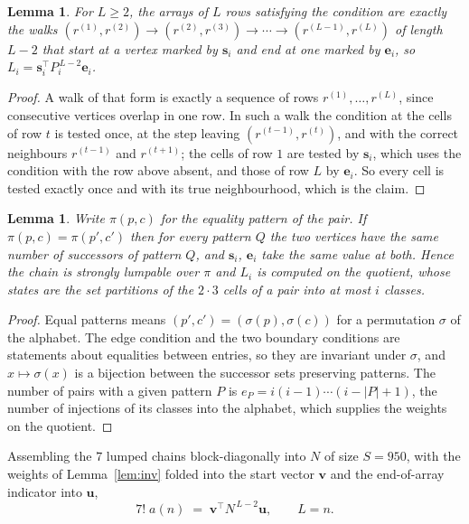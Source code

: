 \documentclass[11pt,a4paper]{article}
\theoremstyle{plain}
\newtheorem{lemma}[theorem]{Lemma}
\theoremstyle{definition}
\begin{document}
\begin{lemma}\label{lem:walk}
For $L\ge2$, the arrays of $L$ rows satisfying the condition are exactly the walks
$(r^{(1)},r^{(2)})\to(r^{(2)},r^{(3)})\to\cdots\to(r^{(L-1)},r^{(L)})$ of length
$L-2$ that start at a vertex marked by $\mathbf{s}_i$ and end at one marked by
$\mathbf{e}_i$, so
$L_i=\mathbf{s}_i^{\!\top}P_i^{\,L-2}\mathbf{e}_i$.
\end{lemma}

\begin{proof}
A walk of that form is exactly a sequence of rows $r^{(1)},\dots,r^{(L)}$, since
consecutive vertices overlap in one row. In such a walk the condition at the cells of
row $t$ is tested once, at the step leaving $(r^{(t-1)},r^{(t)})$, and with the
correct neighbours $r^{(t-1)}$ and $r^{(t+1)}$; the cells of row $1$ are tested by
$\mathbf{s}_i$, which uses the condition with the row above absent, and those of row
$L$ by $\mathbf{e}_i$. So every cell is tested exactly once and with its true
neighbourhood, which is the claim.
\end{proof}

\begin{lemma}\label{lem:lump}
Write $\pi(p,c)$ for the equality pattern of the pair. If $\pi(p,c)=\pi(p',c')$ then for
every pattern $Q$ the two vertices have the same number of successors of pattern $Q$, and
$\mathbf{s}_i$, $\mathbf{e}_i$ take the same value at both. Hence the chain is strongly
lumpable over $\pi$ and $L_i$ is computed on the quotient, whose states are the set
partitions of the $2\cdot3$ cells of a pair into at most $i$ classes.
\end{lemma}

\begin{proof}
Equal patterns means $(p',c')=(\sigma(p),\sigma(c))$ for a permutation $\sigma$ of the
alphabet. The edge condition and the two boundary conditions are statements about equalities
between entries, so they are invariant under $\sigma$, and $x\mapsto\sigma(x)$ is a bijection
between the successor sets preserving patterns. The number of pairs with a given pattern $P$
is $e_P=i(i-1)\cdots(i-|P|+1)$, the number of injections of its classes into the alphabet,
which supplies the weights on the quotient.
\end{proof}

Assembling the $7$ lumped chains block-diagonally into $N$ of size $S=950$, with the
weights of Lemma~\ref{lem:inv} folded into the start vector $\mathbf{v}$ and the
end-of-array indicator into $\mathbf{u}$,
\begin{equation}\label{eq:walk2}
7!\;a(n)\;=\;\mathbf{v}^{\!\top}N^{\,L-2}\mathbf{u},\qquad L=n .
\end{equation}
\end{document}
